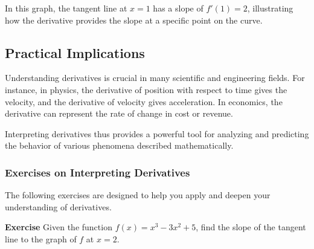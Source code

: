 \documentclass[a4paper,12pt]{book}
\newenvironment{exercise}[1][]
  {\par\medskip\noindent\textbf{Exercise #1} \rmfamily}
  {\medskip}
\begin{document}
\begin{center}
\end{center}

In this graph, the tangent line at \( x = 1 \) has a slope of \( f'(1) = 2 \), illustrating how the derivative provides the slope at a specific point on the curve.

\subsection{Practical Implications}
Understanding derivatives is crucial in many scientific and engineering fields. For instance, in physics, the derivative of position with respect to time gives the velocity, and the derivative of velocity gives acceleration. In economics, the derivative can represent the rate of change in cost or revenue.

Interpreting derivatives thus provides a powerful tool for analyzing and predicting the behavior of various phenomena described mathematically.

\subsubsection*{Exercises on Interpreting Derivatives}

The following exercises are designed to help you apply and deepen your understanding of derivatives.

\begin{exercise}
Given the function \( f(x) = x^3 - 3x^2 + 5 \), find the slope of the tangent line to the graph of \( f \) at \( x = 2 \).
\end{exercise}
\end{document}
